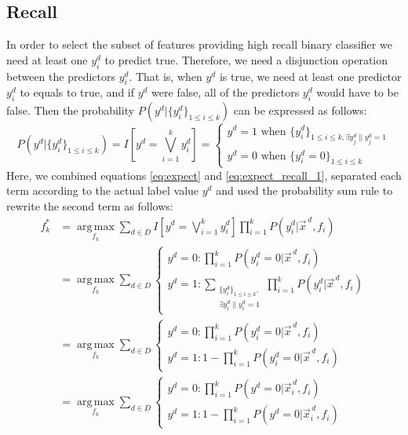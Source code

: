 \documentclass[11pt,a4paper]{article}
\begin{document}
\subsection{Recall}
In order to select the subset of features providing high recall binary classifier we need at least one $y^d_i$ to predict true. Therefore, we need a disjunction operation between the predictors $y^d_i$. That is, when $y^d$ is true, we need at least one predictor $y^d_i$ to equals to true, and if $y^d$ were false, all of the predictors $y^d_i$ would have to be false. Then the probability $P\left(y^d|\{y^d_i\}_{1\leq i\leq k}\right)$ can be expressed as follows:
\begin{equation}
P\left(y^d|\{y^d_i\}_{1\leq i\leq k}\right)=I\left[y^d=\bigvee_{i=1}^k y^d_i\right]=
\begin{cases}
	y^d=1 \text{ when } \{y_i^d\}_{1\leq i\leq k,\exists{y_j^d\|y_j^d=1}}\\
	y^d=0 \text{ when } \{y_i^d=0\}_{1\leq i\leq k}
\end{cases}\label{eq:expect_recall_1}
\end{equation}
Here, we combined equations \eqref{eq:expect} and \eqref{eq:expect_recall_1}, separated each term according to the actual label value $y^d$ and used the probability sum rule to rewrite the second term as follows:
\begin{align}
f_k^*&=\operatorname*{arg\,max}_{f_k}\sum_{d\in D}I\left[y^d=\bigvee_{i=1}^k y^d_i\right]\prod_{i=1}^kP\left(y_i^d|\vec{x}^{\,d},f_i\right)\nonumber\\[0.5em]
&=\operatorname*{arg\,max}_{f_k}\sum_{d\in D}
\begin{cases}
	y^d=0: \prod_{i=1}^kP\left(y_i^d=0|\vec{x}^{\,d},f_i\right)\\
	y^d=1: \sum_{\substack{\{y_i^d\}_{1\leq i\leq k},\\ \exists{y_i^d\|y_i^d=1}}}\prod_{i=1}^kP\left(y_i^d|\vec{x}^{\,d},f_i\right)
\end{cases}\nonumber\\[0.5em]
&=\operatorname*{arg\,max}_{f_k}\sum_{d\in D}
\begin{cases}
	y^d=0: \prod_{i=1}^kP\left(y_i^d=0|\vec{x}^{\,d},f_i\right)\\
	y^d=1: 1-\prod_{i=1}^kP\left(y_i^d=0|\vec{x}^{\,d},f_i\right)
\end{cases}\label{eq:expect_recall_2}\\
&=\operatorname*{arg\,max}_{f_k}\sum_{d\in D}
\begin{cases}
	y^d=0: \prod_{i=1}^kP\left(y^d=0|\vec{x}_i^{\,d},f_i\right)\\
	y^d=1: 1-\prod_{i=1}^kP\left(y^d=0|\vec{x}_i^{\,d},f_i\right)
\end{cases}\nonumber
\end{align}
\end{document}
